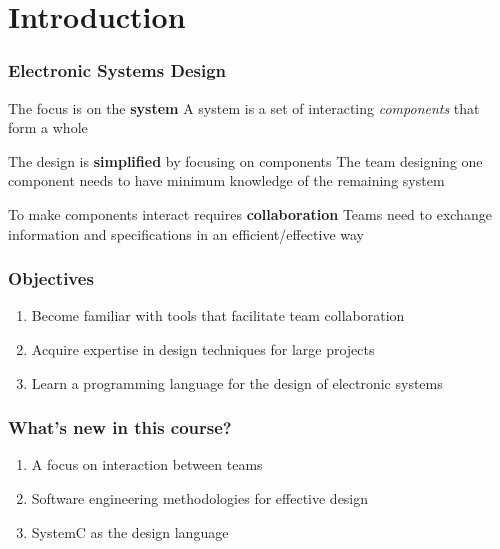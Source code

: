 \section{Introduction}

\begin{frame}
\frametitle{Electronic Systems Design}
\begin{block}{The focus is on the {\bfseries system}}
A system is a set of interacting {\em components} that form a whole
\end{block}
\pause
\begin{exampleblock}{The design is {\bfseries simplified} by focusing on components}
The team designing one component needs to have minimum knowledge of the remaining system
\end{exampleblock}
\pause
\begin{alertblock}{To make components interact requires {\bfseries collaboration}}
Teams need to exchange information and specifications in an efficient/effective way
\end{alertblock}
\end{frame}

\begin{frame}
\frametitle{Objectives}
\begin{enumerate}
\item Become familiar with tools that facilitate team collaboration
\item Acquire expertise in design techniques for large projects
\item Learn a programming language for the design of electronic systems
\end{enumerate}
\end{frame}

\begin{frame}
\frametitle{What's new in this course?}
\begin{enumerate}
\item A focus on interaction between teams
\item Software engineering methodologies for effective design
\item SystemC as the design language
\end{enumerate}
\end{frame}

